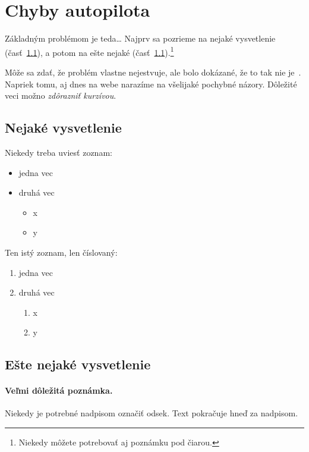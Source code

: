 \documentclass[10pt,twoside,slovak,a4paper]{article}
\begin{document}
\section{Chyby autopilota} \label{chyby}

Základným problémom je teda\ldots{} Najprv sa pozrieme na nejaké vysvetlenie (časť~\ref{ina:nejake}), a potom na ešte nejaké (časť~\ref{ina:nejake}).\footnote{Niekedy môžete potrebovať aj poznámku pod čiarou.}

Môže sa zdať, že problém vlastne nejestvuje\cite{Coplien:MPD}, ale bolo dokázané, že to tak nie je~\cite{Czarnecki:Staged, Czarnecki:Progress}. Napriek tomu, aj dnes na webe narazíme na všelijaké pochybné názory\cite{PLP-Framework}. Dôležité veci možno \emph{zdôrazniť kurzívou}.


\subsection{Nejaké vysvetlenie} \label{ina:nejake}

Niekedy treba uviesť zoznam:

\begin{itemize}
\item jedna vec
\item druhá vec
	\begin{itemize}
	\item x
	\item y
	\end{itemize}
\end{itemize}

Ten istý zoznam, len číslovaný:

\begin{enumerate}
\item jedna vec
\item druhá vec
	\begin{enumerate}
	\item x
	\item y
	\end{enumerate}
\end{enumerate}


\subsection{Ešte nejaké vysvetlenie} \label{ina:este}

\paragraph{Veľmi dôležitá poznámka.}
Niekedy je potrebné nadpisom označiť odsek. Text pokračuje hneď za nadpisom.
\end{document}
